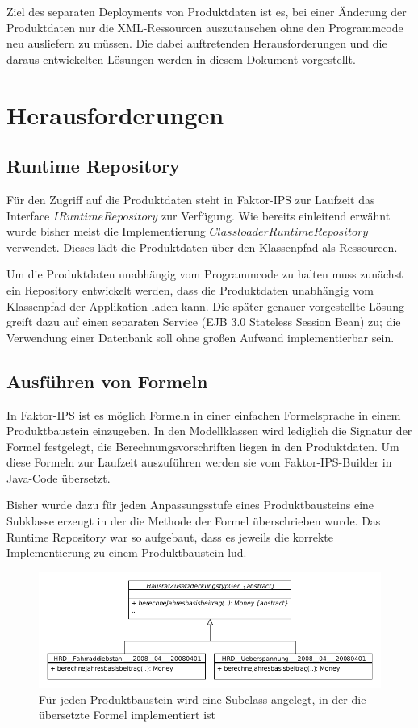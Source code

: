 \documentclass[headsepline=true, footsepline=true]{scrartcl}
\begin{document}
Ziel des separaten Deployments von Produktdaten ist es, bei einer Änderung der
Produktdaten nur die XML-Ressourcen auszutauschen ohne den Programmcode neu
ausliefern zu müssen. Die dabei auftretenden Herausforderungen und die daraus
entwickelten Lösungen werden in diesem Dokument vorgestellt.

\section{Herausforderungen}

\subsection{Runtime Repository}

Für den Zugriff auf die Produktdaten steht in Faktor-IPS zur Laufzeit das
Interface $IRuntimeRepository$ zur Verfügung. Wie bereits einleitend erwähnt
wurde bisher meist die Implementierung $ClassloaderRuntimeRepository$ verwendet.
Dieses lädt die Produktdaten über den Klassenpfad als Ressourcen.

Um die Produktdaten unabhängig vom Programmcode zu halten muss zunächst ein
Repository entwickelt werden, dass die Produktdaten unabhängig vom Klassenpfad
der Applikation laden kann. Die später genauer vorgestellte Lösung greift dazu
auf einen separaten Service (EJB 3.0 Stateless Session Bean) zu; die Verwendung
einer Datenbank soll ohne großen Aufwand implementierbar sein.

\subsection{Ausführen von Formeln}

In Faktor-IPS ist es möglich Formeln in einer einfachen Formelsprache in einem
Produktbaustein einzugeben. In den Modellklassen wird lediglich die Signatur der
Formel festgelegt, die Berechnungsvorschriften liegen in den Produktdaten. Um
diese Formeln zur Laufzeit auszuführen werden sie vom Faktor-IPS-Builder in
Java-Code übersetzt.

Bisher wurde dazu für jeden Anpassungsstufe eines Produktbausteins eine Subklasse
erzeugt in der die Methode der Formel überschrieben wurde. Das Runtime Repository
war so aufgebaut, dass es jeweils die korrekte Implementierung zu einem
Produktbaustein lud.

\begin{figure}[htb] \centering
\includegraphics[width=13cm]{./pics/subclassing.png} \caption{Für jeden
Produktbaustein wird eine Subclass angelegt, in der die übersetzte Formel
implementiert ist}
\label{subclassing}
\end{figure}
\end{document}
